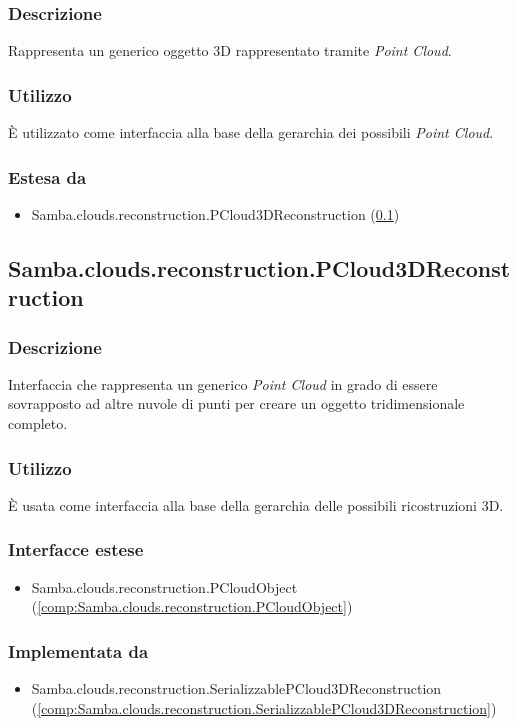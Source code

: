 \subsubsection{Descrizione}
Rappresenta un generico oggetto 3D rappresentato tramite \emph{Point Cloud}.
\subsubsection{Utilizzo}
È utilizzato come interfaccia alla base della gerarchia dei possibili \emph{Point Cloud}.
\subsubsection{Estesa da}
\begin{itemize}
	\item Samba.clouds.reconstruction.PCloud3DReconstruction (\ref{comp:Samba.clouds.reconstruction.PCloud3DReconstruction})
\end{itemize}

\subsection{Samba.clouds.reconstruction.PCloud3DReconstruction}\label{comp:Samba.clouds.reconstruction.PCloud3DReconstruction}
\subsubsection{Descrizione}
Interfaccia che rappresenta un generico \emph{Point Cloud} in grado di essere sovrapposto ad altre nuvole di punti per creare un oggetto tridimensionale completo.
\subsubsection{Utilizzo}
È usata come interfaccia alla base della gerarchia delle possibili ricostruzioni 3D.
\subsubsection{Interfacce estese}
\begin{itemize}
	\item Samba.clouds.reconstruction.PCloudObject (\ref{comp:Samba.clouds.reconstruction.PCloudObject})
\end{itemize}
\subsubsection{Implementata da}
\begin{itemize}
	\item Samba.clouds.reconstruction.SerializzablePCloud3DReconstruction (\ref{comp:Samba.clouds.reconstruction.SerializzablePCloud3DReconstruction})
\end{itemize}

